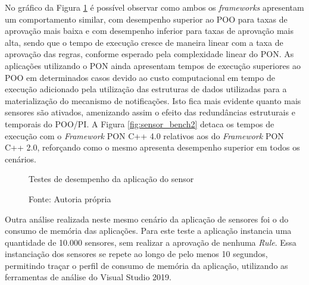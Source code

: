 No gráfico da Figura \ref{fig:sensor_bench} é possível observar como ambos os
\textit{frameworks} apresentam um comportamento similar, com desempenho superior
ao POO para taxas de aprovação mais baixa e com desempenho inferior para taxas
de aprovação mais alta, sendo que o tempo de execução cresce de maneira linear
com a taxa de aprovação das regras, conforme esperado pela complexidade linear
do PON. As aplicações utilizando o PON ainda apresentam tempos de execução
superiores ao POO em determinados casos devido ao custo computacional em tempo
de execução adicionado pela utilização das estruturas de dados utilizadas para a
materialização do mecanismo de notificações. Isto fica mais evidente quanto mais
sensores são ativados, amenizando assim o efeito das redundâncias estruturais e
temporais do POO/PI. A Figura \ref{fig:sensor_bench2} detaca os tempos de
execução com o \textit{Framework} PON C++ 4.0 relativos aos do
\textit{Framework} PON C++ 2.0, reforçando como o mesmo apresenta desempenho
superior em todos os cenários.

\begin{figure}[!htb]
\centering
{}
\caption{Testes de desempenho da aplicação do sensor}
\caption*{Fonte: Autoria própria}
\label{fig:sensor_bench}
\end{figure}

Outra análise realizada neste mesmo cenário da aplicação de sensores foi o do
consumo de memória das aplicações. Para este teste a aplicação instancia uma
quantidade de 10.000 sensores, sem realizar a aprovação de nenhuma \textit{Rule}.
Essa instanciação dos sensores se repete ao longo de pelo menos 10 segundos,
permitindo traçar o perfil de consumo de memória da aplicação, utilizando as
ferramentas de análise do Visual Studio 2019.

